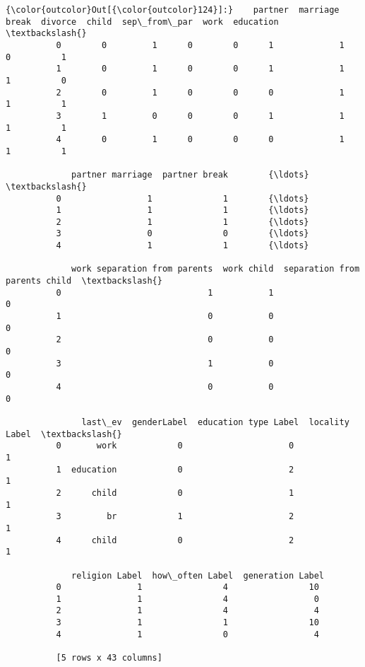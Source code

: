 \documentclass[11pt]{article}
\begin{document}
\begin{Verbatim}[commandchars=\\\{\}]
{\color{outcolor}Out[{\color{outcolor}124}]:}    partner  marriage  break  divorce  child  sep\_from\_par  work  education  \textbackslash{}
          0        0         1      0        0      1             1     0          1   
          1        0         1      0        0      1             1     1          0   
          2        0         1      0        0      0             1     1          1   
          3        1         0      0        0      1             1     1          1   
          4        0         1      0        0      0             1     1          1   
          
             partner marriage  partner break        {\ldots}         \textbackslash{}
          0                 1              1        {\ldots}          
          1                 1              1        {\ldots}          
          2                 1              1        {\ldots}          
          3                 0              0        {\ldots}          
          4                 1              1        {\ldots}          
          
             work separation from parents  work child  separation from parents child  \textbackslash{}
          0                             1           1                              0   
          1                             0           0                              0   
          2                             0           0                              0   
          3                             1           0                              0   
          4                             0           0                              0   
          
               last\_ev  genderLabel  education type Label  locality Label  \textbackslash{}
          0       work            0                     0               1   
          1  education            0                     2               1   
          2      child            0                     1               1   
          3         br            1                     2               1   
          4      child            0                     2               1   
          
             religion Label  how\_often Label  generation Label  
          0               1                4                10  
          1               1                4                 0  
          2               1                4                 4  
          3               1                1                10  
          4               1                0                 4  
          
          [5 rows x 43 columns]
\end{Verbatim}
            
\end{document}
